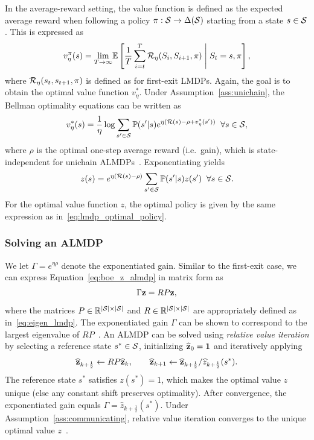 In the average-reward setting, the value function is defined as the expected average reward when following a policy $\pi:\mathcal{S}\rightarrow\Delta(\mathcal{S})$ starting from a state $s\in\mathcal{S}$. This is expressed as
\begin{equation}
  v_\eta^\pi(s) = \underset{T\rightarrow\infty}\lim \mathbb{E}\left[\frac{1}{T} \sum_{i=t}^T \mathcal{R}_\eta(S_i, S_{i+1}, \pi)\;\middle\lvert\;S_t = s, \pi\right],
  \label{eq:value_function_almdp}
\end{equation}
where $\mathcal{R}_\eta(s_t, s_{t+1}, \pi)$ is defined as for first-exit LMDPs.
Again, the goal is to obtain the optimal value function $v^*_\eta$. Under Assumption~\ref{ass:unichain}, the Bellman optimality equations can be written as
\begin{equation}
  v^*_\eta(s) = \frac 1 \eta \log{\sum_{s'\in\mathcal{S}}\mathbb{P}(s'\lvert s)e^{\eta(\mathcal{R}(s) - \rho + v^*_\eta(s'))}} \;\;\forall s\in\mathcal{S},
  \label{eq:boe_almdp}
\end{equation}
where $\rho$ is the optimal one-step average reward (i.e.~gain), which is state-independent for unichain ALMDPs~\citep{Todorov2006}. Exponentiating yields
\begin{equation}
  z(s) = e^{\eta(\mathcal{R}(s) - \rho)} \sum_{s'\in\mathcal{S}}\mathbb{P}(s'\lvert s)z(s') \;\;\forall s\in\mathcal{S}.
  \label{eq:boe_z_almdp}
\end{equation}
For the optimal value function $z$, the optimal policy is given by the same expression as in~\eqref{eq:lmdp_optimal_policy}.

\subsubsection{Solving an ALMDP}

We let $\Gamma=e^{\eta\rho}$ denote the exponentiated gain. Similar to the first-exit case, we can express Equation~\eqref{eq:boe_z_almdp} in matrix form as
\begin{equation}\label{eq:rel_opt}
  \Gamma {\bf z} = R P {\bf z},
\end{equation}
where the matrices $P\in \mathbb{R}^{\lvert\mathcal{S}\rvert\times\lvert\mathcal{S}\rvert}$ and $R\in \mathbb{R}^{\lvert\mathcal{S}\rvert\times\lvert\mathcal{S}\rvert}$ are appropriately defined as in~\eqref{eq:eigen_lmdp}. The exponentiated gain $\Gamma$ can be shown to correspond to the largest eigenvalue of $RP$~\citep{Todorov2009}.
An ALMDP can be solved using {\em relative value iteration} by selecting a reference state $s^*\in\mathcal{S}$, initializing $\widehat{\bf z}_0={\bf 1}$ and iteratively applying
\begin{equation*}
  \widehat{\bf z}_{k+\frac 1 2} \gets R P \widehat{\bf z}_k, \quad \quad \widehat{\bf z}_{k+1} \gets \widehat{\bf z}_{k+\frac 1 2} / \widehat z_{k+\frac 1 2}(s^*).
\end{equation*}
The reference state $s^*$ satisfies $z(s^*)=1$, which makes the optimal value $z$ unique (else any constant shift preserves optimality). After convergence, the exponentiated gain equals $\Gamma=\widehat z_{k+\frac 1 2}(s^*)$. Under Assumption~\ref{ass:communicating}, relative value iteration converges to the unique optimal value $z$~\citep{Todorov2009}.

